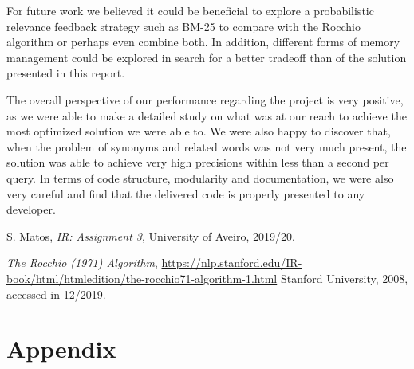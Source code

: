 \documentclass[12pt]{article}
\begin{document}
For future work we believed it could be beneficial to explore a probabilistic
relevance feedback strategy such as BM-25 to compare with the Rocchio algorithm
or perhaps even combine both.
In addition, different forms of memory management could be explored in search
for a better tradeoff than of the solution presented in this report.

The overall perspective of our performance regarding the project is very positive,
as we were able to make a detailed study on what was at our reach to achieve the 
most optimized solution we were able to.
We were also happy to discover that, when the problem of synonyms and related 
words was not very much present, the solution was able to achieve very high 
precisions within less than a second per query.
In terms of code structure, modularity and documentation, we were also very 
careful and find that the delivered code is properly presented to any developer.

\begin{thebibliography}{9}
  

    S. Matos,
    \textit{IR: Assignment 3},
    University of Aveiro,
    2019/20.

    \textit{The Rocchio (1971) Algorithm},
    \url{https://nlp.stanford.edu/IR-book/html/htmledition/the-rocchio71-algorithm-1.html}
    Stanford University,
    2008,
    accessed in 12/2019.
  
\end{thebibliography}

\appendix
\section*{Appendix}
\end{document}
